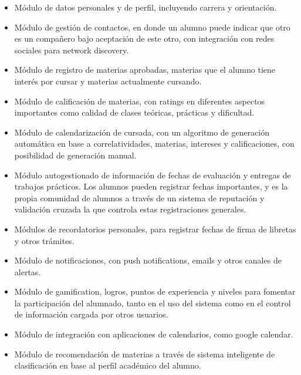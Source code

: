 \documentclass[a4paper,11pt]{article}
\begin{document}
\begin{itemize}

    \item Módulo de datos personales y de perfil, incluyendo carrera y
      orientación.

    \item Módulo de gestión de contactos, en donde un alumno puede indicar que
      otro es un compañero bajo aceptación de este otro, con integración con
      redes sociales para network discovery.

    \item Módulo de registro de materias aprobadas, materias que el alumno
      tiene interés por cursar y materias actualmente cursando.

    \item Módulo de calificación de materias, con ratings en diferentes
      aspectos importantes como calidad de clases teóricas, prácticas y
      dificultad.

    \item Módulo de calendarización de cursada, con un algoritmo de generación
      automática en base a correlatividades, materias, intereses y
      calificaciones, con posibilidad de generación manual.

    \item Módulo autogestionado de información de fechas de evaluación y
      entregas de trabajos prácticos. Los alumnos pueden registrar fechas
      importantes, y es la propia comunidad de alumnos a través de un sistema
      de reputación y validación cruzada la que controla estas registraciones
      generales.

    \item Módulos de recordatorios personales, para registrar fechas de firma
      de libretas y otros trámites.

    \item Módulo de notificaciones, con push notifications, emails y otros
      canales de alertas.

    \item Módulo de gamification, logros, puntos de experiencia y niveles para
      fomentar la participación del alumnado, tanto en el uso del sistema como
      en el control de información cargada por otros usuarios.

    \item Módulo de integración con aplicaciones de calendarios, como google
      calendar.

    \item Módulo de recomendación de materias a través de sistema inteligente
      de clasificación en base al perfil académico del alumno.

\end{itemize}
\end{document}
